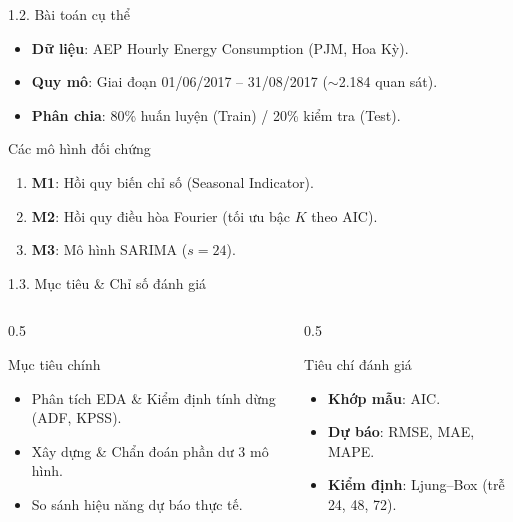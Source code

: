 \documentclass[aspectratio=43]{beamer}
\begin{document}
\begin{frame}{1.2. Bài toán cụ thể}
    \begin{itemize}
        \item \textbf{Dữ liệu}: AEP Hourly Energy Consumption (PJM, Hoa Kỳ).
        \item \textbf{Quy mô}: Giai đoạn 01/06/2017 – 31/08/2017 ($\sim$2.184 quan sát).
        \item \textbf{Phân chia}: 80\% huấn luyện (Train) / 20\% kiểm tra (Test).
    \end{itemize}
    \begin{block}{Các mô hình đối chứng}
        \begin{enumerate}
            \item \textbf{M1}: Hồi quy biến chỉ số (Seasonal Indicator).
            \item \textbf{M2}: Hồi quy điều hòa Fourier (tối ưu bậc $K$ theo AIC).
            \item \textbf{M3}: Mô hình SARIMA ($s=24$).
        \end{enumerate}
    \end{block}
\end{frame}

\begin{frame}{1.3. Mục tiêu \& Chỉ số đánh giá}
    \begin{columns}[T]
        \begin{column}{0.5\textwidth}
            \begin{block}{Mục tiêu chính}
                \begin{itemize}
                    \item Phân tích EDA \& Kiểm định tính dừng (ADF, KPSS).
                    \item Xây dựng \& Chẩn đoán phần dư 3 mô hình.
                    \item So sánh hiệu năng dự báo thực tế.
                \end{itemize}
            \end{block}
        \end{column}
        
        \begin{column}{0.5\textwidth}
            \begin{block}{Tiêu chí đánh giá}
                \begin{itemize}
                    \item \textbf{Khớp mẫu}: AIC.
                    \item \textbf{Dự báo}: RMSE, MAE, MAPE.
                    \item \textbf{Kiểm định}: Ljung–Box (trễ 24, 48, 72).
                \end{itemize}
            \end{block}
        \end{column}
    \end{columns}
\end{frame}
\end{document}
